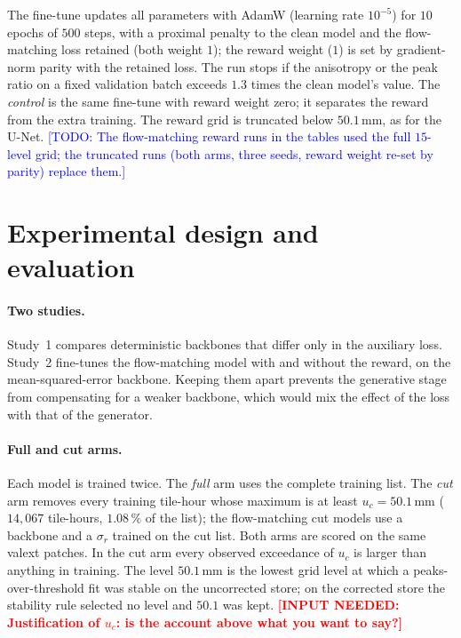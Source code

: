 \documentclass{article}
\newcommand{\needinput}[1]{\textcolor{red}{\textbf{[INPUT NEEDED: #1]}}}
\newcommand{\todo}[1]{\textcolor{blue}{[TODO: #1]}}
\begin{document}
The fine-tune updates all parameters with AdamW (learning rate $10^{-5}$) for $10$ epochs of $500$ steps, with a
proximal penalty to the clean model and the flow-matching loss retained (both weight $1$); the reward weight ($1$) is
set by gradient-norm parity with the retained loss. The run stops if the anisotropy or the peak ratio on a fixed
validation batch exceeds $1.3$ times the clean model's value. The \emph{control} is the same fine-tune with reward weight
zero; it separates the reward from the extra training. The reward grid is truncated below $50.1\,\mathrm{mm}$, as
for the U-Net. \todo{The flow-matching reward runs in the tables used the full $15$-level grid; the truncated runs
(both arms, three seeds, reward weight re-set by parity) replace them.}

\section{Experimental design and evaluation}
\label{sec:design}
\paragraph{Two studies.} Study~1 compares deterministic backbones that differ only in the auxiliary loss. Study~2
fine-tunes the flow-matching model with and without the reward, on the mean-squared-error backbone. Keeping them apart
prevents the generative stage from compensating for a weaker backbone, which would mix the effect of the loss with
that of the generator.

\paragraph{Full and cut arms.} Each model is trained twice. The \emph{full} arm uses the complete training list. The
\emph{cut} arm removes every training tile-hour whose maximum is at least $u_c = 50.1\,\mathrm{mm}$ ($14{,}067$
tile-hours, $1.08\,\%$ of the list); the flow-matching cut models use a backbone and a $\sigma_r$ trained on the cut
list. Both arms are scored on the same valext patches. In the cut arm every observed exceedance of $u_c$ is larger than
anything in training. The level $50.1\,\mathrm{mm}$ is the lowest grid level at which a peaks-over-threshold fit was
stable on the uncorrected store; on the corrected store the stability rule selected no level and $50.1$ was kept.
\needinput{Justification of $u_c$: is the account above what you want to say?}
\end{document}
